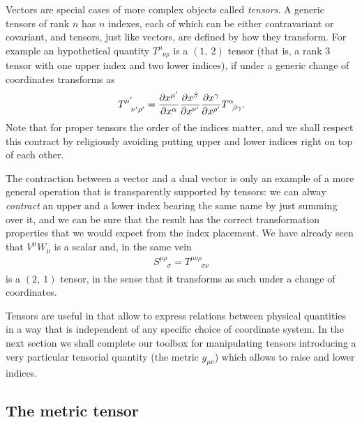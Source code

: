 Vectors are special cases of more complex objects called \emph{tensors}. A generic
tensors of rank $n$ has $n$ indexes, each of which can be either contravariant or
covariant, and tensors, just like vectors, are defined by how they transform.
For example an hypothetical quantity $T^\mu_{\phantom{\mu}\nu\rho}$ is a $(1,~2)$
tensor (that is, a rank 3 tensor with one upper index and two lower indices), if
under a generic change of coordinates transforms as
\begin{align}
  T^{\mu'}_{\phantom{\mu'}\nu'\rho'} =
  \pdv{x^{\mu'}}{x^\alpha} \pdv{x^\beta}{x^{\nu'}} \pdv{x^\gamma}{x^{\rho'}}
  T^\alpha_{\phantom{\alpha}\beta\gamma}.
\end{align}
Note that for proper tensors the order of the indices matter, and we shall respect
this contract by religiously avoiding putting upper and lower indices right on top
of each other.

The contraction between a vector and a dual vector is only an example of a more general
operation that is transparently supported by tensors: we can alway \emph{contract}
an upper and a lower index bearing the same name by just summing over it, and we
can be sure that the result has the correct transformation properties that we would
expect from the index placement. We have already seen that $V^\mu W_\mu$ is a scalar
and, in the same vein
\begin{align}
  S^{\mu\rho}_{\phantom{\mu\rho}\sigma} = T^{\mu\nu\rho}_{\phantom{\mu\nu\rho}\sigma\nu}
\end{align}
is a $(2,~1)$ tensor, in the sense that it transforms as such under a change of
coordinates.

Tensors are useful in that allow to express relations between physical quantities in
a way that is independent of any specific choice of coordinate system. In the next
section we shall complete our toolbox for manipulating tensors introducing a very
particular tensorial quantity (the metric $g_{\mu\nu}$) which allows to raise and
lower indices.



\subsection{The metric tensor}

